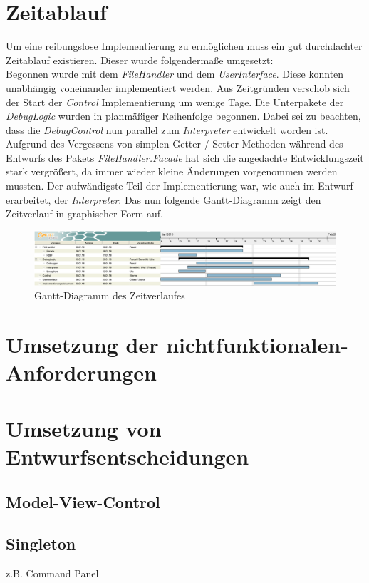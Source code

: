 \documentclass[parskip=full]{scrartcl}
\begin{document}
\section{Zeitablauf}
Um eine reibungslose Implementierung zu ermöglichen muss ein gut durchdachter Zeitablauf existieren.
Dieser wurde folgendermaße umgesetzt:\\
Begonnen wurde mit dem \textit{FileHandler} und dem \textit{UserInterface}. Diese konnten unabhängig voneinander implementiert werden.
Aus Zeitgründen verschob sich der Start der \textit{Control} Implementierung um wenige Tage.
Die Unterpakete der \textit{DebugLogic} wurden in planmäßiger Reihenfolge begonnen. Dabei sei zu beachten, dass die \textit{DebugControl} nun parallel zum \textit{Interpreter} entwickelt worden ist.
Aufgrund des Vergessens von simplen Getter / Setter Methoden während des Entwurfs des Pakets \textit{FileHandler.Facade} hat sich die angedachte Entwicklungszeit stark vergrößert, da immer wieder kleine Änderungen vorgenommen werden mussten.
Der aufwändigste Teil der Implementierung war, wie auch im Entwurf erarbeitet, der \textit{Interpreter}.
Das nun folgende Gantt-Diagramm zeigt den Zeitverlauf in graphischer Form auf.
\begin{figure}[!h]
\centering
\includegraphics[width=1.0\textwidth]{ganntDiagramm_neu_crop.pdf}
\caption{Gantt-Diagramm des Zeitverlaufes}
\end{figure}

\section{Umsetzung der nichtfunktionalen-Anforderungen}

\section{Umsetzung von Entwurfsentscheidungen}
\subsection{Model-View-Control}

\subsection{Singleton}
z.B. Command Panel
\end{document}
